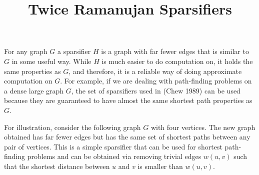 \documentclass[
  letterpaper,
  DIV=11,
  numbers=noendperiod]{scrartcl}
\title{Twice Ramanujan Sparsifiers}
\author{}
\date{}
\theoremstyle{plain}
\theoremstyle{plain}
\theoremstyle{plain}
\theoremstyle{definition}
\theoremstyle{remark}
\begin{document}
\maketitle
\ifdefined\Shaded\renewenvironment{Shaded}{\begin{tcolorbox}[sharp corners, boxrule=0pt, borderline west={3pt}{0pt}{shadecolor}, breakable, enhanced, frame hidden, interior hidden]}{\end{tcolorbox}}\fi

For any graph \(G\) a sparsifier \(H\) is a graph with far fewer edges
that is similar to \(G\) in some useful way. While \(H\) is much easier
to do computation on, it holds the same properties as \(G\), and
therefore, it is a reliable way of doing approximate computation on
\(G\). For example, if we are dealing with path-finding problems on a
dense large graph \(G\), the set of sparsifiers used in (Chew 1989) can
be used because they are guaranteed to have almost the same shortest
path properties as \(G\).

For illustration, consider the following graph \(G\) with four vertices.
The new graph obtained has far fewer edges but has the same set of
shortest paths between any pair of vertices. This is a simple sparsifier
that can be used for shortest path-finding problems and can be obtained
via removing trivial edges \(w(u,v)\) such that the shortest distance
between \(u\) and \(v\) is smaller than \(w(u,v)\).
\end{document}
